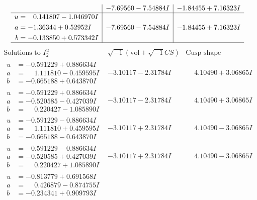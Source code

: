 \documentclass[1p]{elsarticle_modified}
\theoremstyle{definition}
\newcommand{\I}{\sqrt{-1}}
\begin{document}
$$\begin{array}{c|c|c}
 & -7.69560 - 7.54884 I & -1.84455 + 7.16323 I \\ \hline\begin{aligned}
u &= \phantom{-}0.141807 - 1.046970 I \\
a &= -1.36344 + 0.52952 I \\
b &= -0.133850 + 0.573342 I\end{aligned}
 & -7.69560 - 7.54884 I & -1.84455 + 7.16323 I\\
 \hline 
 \end{array}$$\newpage$$\begin{array}{c|c|c}  
\text{Solutions to }I^u_{2}& \I (\text{vol} + \sqrt{-1}CS) & \text{Cusp shape}\\
 \hline 
\begin{aligned}
u &= -0.591229 + 0.886634 I \\
a &= \phantom{-}1.111810 - 0.459595 I \\
b &= -0.665188 + 0.643870 I\end{aligned}
 & -3.10117 - 2.31784 I & \phantom{-}4.10490 + 3.06865 I \\ \hline\begin{aligned}
u &= -0.591229 + 0.886634 I \\
a &= -0.520585 - 0.427039 I \\
b &= \phantom{-}0.220427 - 1.085890 I\end{aligned}
 & -3.10117 - 2.31784 I & \phantom{-}4.10490 + 3.06865 I \\ \hline\begin{aligned}
u &= -0.591229 - 0.886634 I \\
a &= \phantom{-}1.111810 + 0.459595 I \\
b &= -0.665188 - 0.643870 I\end{aligned}
 & -3.10117 + 2.31784 I & \phantom{-}4.10490 - 3.06865 I \\ \hline\begin{aligned}
u &= -0.591229 - 0.886634 I \\
a &= -0.520585 + 0.427039 I \\
b &= \phantom{-}0.220427 + 1.085890 I\end{aligned}
 & -3.10117 + 2.31784 I & \phantom{-}4.10490 - 3.06865 I \\ \hline\begin{aligned}
u &= -0.813779 + 0.691568 I \\
a &= \phantom{-}0.426879 - 0.874755 I \\
b &= -0.234341 + 0.909793 I\end{aligned}

\end{array}$$
\end{document}
